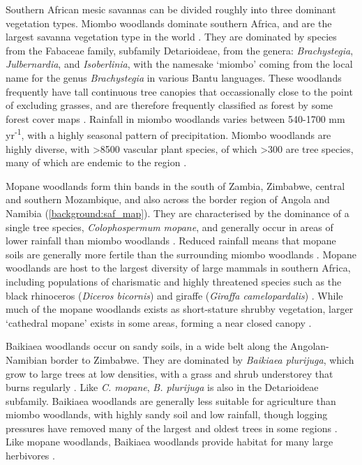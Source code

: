 \begin{refsection}
Southern African mesic savannas can be divided roughly into three dominant vegetation types. Miombo woodlands dominate southern Africa, and are the largest savanna vegetation type in the world \citep{Ryan2011}. They are dominated by species from the Fabaceae family, subfamily Detarioideae, from the genera: \textit{Brachystegia}, \textit{Julbernardia}, and \textit{Isoberlinia}, with the namesake `miombo' coming from the local name for the genus \textit{Brachystegia} in various Bantu languages. These woodlands frequently have tall continuous tree canopies that occassionally close to the point of excluding grasses, and are therefore frequently classified as forest by some forest cover maps \citep{Hansen2013}. Rainfall in miombo woodlands varies between 540-1700 mm yr\textsuperscript{-1}, with a highly seasonal pattern of precipitation. Miombo woodlands are highly diverse, with >8500 vascular plant species, of which >300 are tree species, many of which are endemic to the region \citep{Frost1996}.

Mopane woodlands form thin bands in the south of Zambia, Zimbabwe, central and southern Mozambique, and also across the border region of Angola and Namibia (\autoref{background:saf_map}). They are characterised by the dominance of a single tree species, \textit{Colophospermum mopane}, and generally occur in areas of lower rainfall than miombo woodlands \citep{Palgrave2003}. Reduced rainfall means that mopane soils are generally more fertile than the surrounding miombo woodlands \citep{Makhado2014}. Mopane woodlands are host to the largest diversity of large mammals in southern Africa, including populations of charismatic and highly threatened species such as the black rhinoceros (\textit{Diceros bicornis}) and giraffe (\textit{Giraffa camelopardalis}) \citep{Mittermeier2003}. While much of the mopane woodlands exists as short-stature shrubby vegetation, larger `cathedral mopane' exists in some areas, forming a near closed canopy \citep{Makhado2014}.

Baikiaea woodlands occur on sandy soils, in a wide belt along the Angolan-Namibian border to Zimbabwe. They are dominated by \textit{Baikiaea plurijuga}, which grow to large trees at low densities, with a grass and shrub understorey that burns regularly \citep{Werger1978}. Like \textit{C. mopane}, \textit{B. plurijuga} is also in the Detarioideae subfamily. Baikiaea woodlands are generally less suitable for agriculture than miombo woodlands, with highly sandy soil and low rainfall, though logging pressures have removed many of the largest and oldest trees in some regions \citep{}. Like mopane woodlands, Baikiaea woodlands provide habitat for many large herbivores \citep{}.


\end{refsection}
